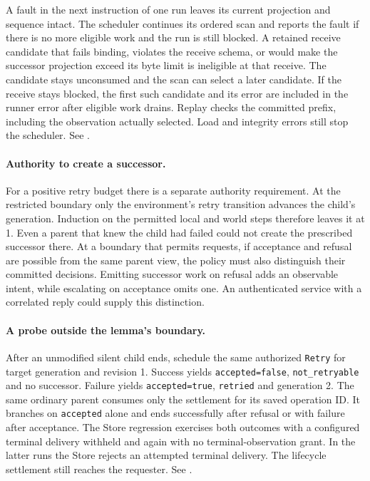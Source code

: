 \documentclass[11pt,a4paper]{article}
\theoremstyle{definition}
\theoremstyle{remark}
\begin{document}
A fault in the next instruction of one run leaves its current projection and sequence intact. The scheduler continues its ordered scan and reports the fault if there is no more eligible work and the run is still blocked. A retained receive candidate that fails binding, violates the receive schema, or would make the successor projection exceed its byte limit is ineligible at that receive. The candidate stays unconsumed and the scan can select a later candidate. If the receive stays blocked, the first such candidate and its error are included in the runner error after eligible work drains. Replay checks the committed prefix, including the observation actually selected. Load and integrity errors still stop the scheduler. See .

\paragraph{Authority to create a successor.} For a positive retry budget there is a separate authority requirement. At the restricted boundary only the environment's retry transition advances the child's generation. Induction on the permitted local and world steps therefore leaves it at 1. Even a parent that knew the child had failed could not create the prescribed successor there. At a boundary that permits requests, if acceptance and refusal are possible from the same parent view, the policy must also distinguish their committed decisions. Emitting successor work on refusal adds an observable intent, while escalating on acceptance omits one. An authenticated service with a correlated reply could supply this distinction.

\paragraph{A probe outside the lemma's boundary.} After an unmodified silent child ends, schedule the same authorized \texttt{Retry} for target generation and revision 1. Success yields \texttt{accepted=false}, \texttt{not\_retryable} and no successor. Failure yields \texttt{accepted=true}, \texttt{retried} and generation 2. The same ordinary parent consumes only the settlement for its saved operation ID. It branches on \texttt{accepted} alone and ends successfully after refusal or with failure after acceptance. The Store regression exercises both outcomes with a configured terminal delivery withheld and again with no terminal-observation grant. In the latter runs the Store rejects an attempted terminal delivery. The lifecycle settlement still reaches the requester. See .
\end{document}
